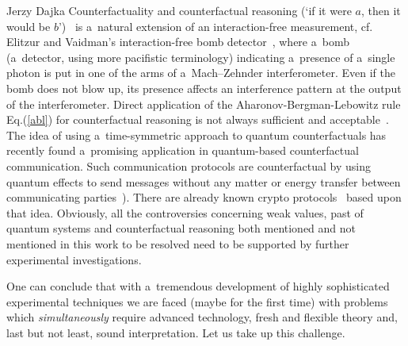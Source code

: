 \begin{artengenv}{Jerzy Dajka}
Counterfactuality and counterfactual reasoning (`if it were $a$, then it would be $b$')~\parencite{kont_book,kont0}  is a~natural  extension of an interaction-free measurement, cf. Elitzur
and Vaidman’s interaction-free bomb detector~\parencite{bomb}, where a~bomb (a~detector, using more pacifistic terminology) indicating a~presence of a~single photon is put in
one of the arms of a~Mach–Zehnder interferometer. Even if the
bomb does not blow up, its  presence  affects an interference pattern  at the output of the interferometer.  Direct application of the Aharonov-Bergman-Lebowitz rule Eq.(\ref{abl}) for counterfactual reasoning is not always sufficient and acceptable~\parencite{kont0}. The idea of using a~time-symmetric approach to quantum counterfactuals has  recently  found a~promising application in quantum-based counterfactual communication. Such communication protocols are counterfactual by using quantum effects to send
messages without any matter or energy transfer between communicating
parties~\parencite{kont1,kont2}). There are already known crypto protocols~\parencite{kont_crypto, kont_crypto0,kont_crypto1,kont_crypto1,kont_crypto2} based upon that idea.
Obviously, all the controversies concerning weak values, past of quantum systems and counterfactual reasoning both mentioned and not mentioned in this work to be resolved need to be supported by further experimental investigations. 

One can conclude that with a~tremendous development of highly sophisticated  experimental techniques we are faced (maybe for the first time) with problems which {\it simultaneously} require advanced technology, fresh and flexible theory and, last but not least, sound interpretation. Let us take up this challenge.    
 

\end{artengenv}
